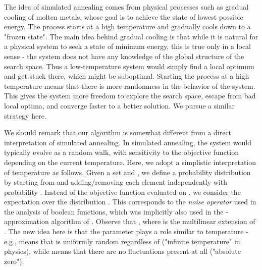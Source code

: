 \documentclass{article}[11pt]
\newtheorem{lemma}[theorem]{Lemma}
\begin{document}
\iffalse
\begin{lemma}
\label{lem:pipage-rounding}
For any matroid , let  be either the matroid polytope (convex hull of independent sets)
or the matroid base polytope (convex hull of bases). Then there is an efficient randomized
rounding technique which for any point  finds a random vertex  of  such that
, and for any submodular function  and its multilinear extension ,

\end{lemma}
\fi

\medskip
{}
The idea of simulated annealing comes from physical processes such as gradual cooling of molten metals,
whose goal is to achieve the state of lowest possible energy. The process starts at a high temperature
and gradually cools down to a "frozen state". The main idea behind gradual cooling is that
while it is natural for a physical system to seek a state of minimum energy,
this is true only in a local sense - the system does not have any knowledge of the global structure
of the search space. Thus a low-temperature system would simply find a local optimum and get stuck there,
which might be suboptimal. Starting the process at a high temperature means that there is more randomness
in the behavior of the system. This gives the system more freedom to explore the search space,
escape from bad local optima, and converge faster to a better solution.
We pursue a similar strategy here.

We should remark that our algorithm is somewhat different from a direct interpretation of
simulated annealing. In simulated annealing, the system would typically evolve as a random walk,
with sensitivity to the objective function depending on the current temperature. Here,
we adopt a simplistic interpretation of temperature as follows.
Given a set  and , we define a probability distribution
 by starting from  and adding/removing each element independently with probability .
Instead of the objective function evaluated on , we consider the expectation over
the distribution .
This corresponds to the {\em noise operator} used in the analysis of boolean functions,
which was implicitly also used in the -approximation algorithm of \cite{FMV07}.
Observe that ,
where  is the multilinear extension of .
The new idea here is that the parameter  plays a role similar to temperature
- e.g.,  means that  is uniformly random regardless of 
("infinite temperature" in physics), while  means that there are no fluctuations
present at all ("absolute zero").
\end{document}
